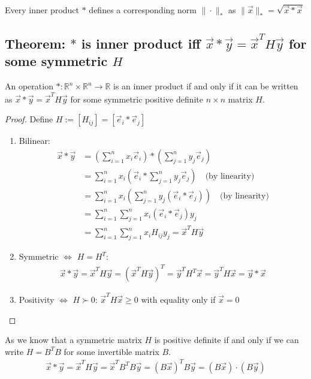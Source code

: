 \documentclass[11pt]{elegantbook}
\begin{document}
\begin{definition}
    Every inner product $*$ defines a corresponding norm $\|\cdot\|_*$ as $\|\vec{x}\|_*=\sqrt{\vec{x}*\vec{x}}$
\end{definition}

\subsection{Theorem: $*$ is inner product iff $\vec{x}*\vec{y}=\vec{x}^T H \vec{y}$ for some symmetric $H$}
\begin{theorem}
    An operation $*: \mathbb{R}^n\times \mathbb{R}^n \rightarrow  \mathbb{R}$ is an inner product if and only if it can be written as $\vec{x}*\vec{y}=\vec{x}^T H \vec{y}$ for some symmetric positive definite $n\times n$ matrix $H$.
\end{theorem}
\begin{proof}
Define $H:=[H_{ij}]=[\vec{e}_i*\vec{e}_j]$
\begin{enumerate}
    \item Bilinear:
    \begin{equation}
        \begin{aligned}
            \vec{x}*\vec{y}&=\left(\sum_{i=1}^nx_i \vec{e}_i\right)*\left(\sum_{j=1}^ny_j \vec{e}_j\right)\\
            &=\sum_{i=1}^nx_i\left(\vec{e}_i*\sum_{j=1}^ny_j \vec{e}_j\right)\quad \text{(by linearity)}\\
            &=\sum_{i=1}^nx_i\left(\sum_{j=1}^ny_j(\vec{e}_i* \vec{e}_j)\right)\quad \text{(by linearity)}\\
            &=\sum_{i=1}^n\sum_{j=1}^nx_i\left(\vec{e}_i* \vec{e}_j\right)y_j\\
            &=\sum_{i=1}^n\sum_{j=1}^nx_iH_{ij}y_j
            =\vec{x}^T H \vec{y}
        \end{aligned}
        \nonumber
    \end{equation}
    \item Symmetric $\Leftrightarrow$ $H=H^T$:
    \begin{equation}
        \begin{aligned}
            \vec{x}* \vec{y}=\vec{x}^TH \vec{y}=\left(\vec{x}^T H \vec{y}\right)^T= \vec{y}^T H^T \vec{x}= \vec{y}^T H \vec{x}=\vec{y}* \vec{x}
        \end{aligned}
        \nonumber
    \end{equation}
    \item Positivity $\Leftrightarrow$ $H\succ 0$: $\vec{x}^T H \vec{x}\geq 0$ with equality only if $\vec{x}=0$
\end{enumerate}
\end{proof}
As we know that a symmetric matrix $H$ is positive definite if and only if we can write $H=B^TB$ for some invertible matrix $B$.
\begin{equation}
    \begin{aligned}
        \vec{x}*\vec{y}=\vec{x}^T H \vec{y}=\vec{x}^T B^T B \vec{y}=(B \vec{x})^T B \vec{y}=(B \vec{x})\cdot (B \vec{y})
    \end{aligned}
    \nonumber
\end{equation}
\end{document}
